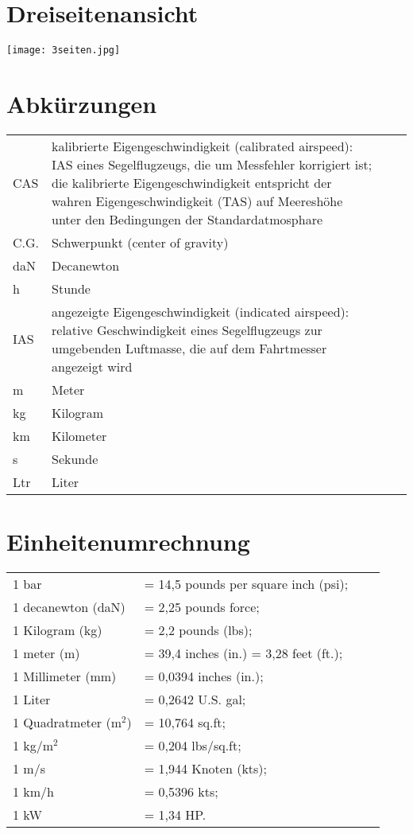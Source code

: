 \section{Dreiseitenansicht}
\vspace{4cm}
\texttt{[image: 3seiten.jpg]}

\section{Abkürzungen}
\begin{tabular}{p{}p{}ll} 
CAS & kalibrierte Eigengeschwindigkeit (calibrated airspeed): IAS eines Segelflugzeugs, die um Messfehler korrigiert ist; die kalibrierte Eigengeschwindigkeit entspricht der wahren Eigengeschwindigkeit (TAS) auf Meereshöhe unter den Bedingungen der Standardatmosphare \\
C.G. & Schwerpunkt (center of gravity)\\
daN & Decanewton \\
h & Stunde \\
IAS & angezeigte Eigengeschwindigkeit (indicated airspeed): relative Geschwindigkeit eines Segelflugzeugs zur umgebenden Luftmasse, die auf dem Fahrtmesser angezeigt wird \\
m & Meter \\
kg & Kilogram  \\
km & Kilometer \\
s & Sekunde \\
Ltr & Liter \\
\end{tabular}

\section{Einheitenumrechnung}
\begin{tabular}{p{}p{}ll}
1 bar & = 14,5 pounds per square inch (psi);\\
1 decanewton (daN)& = 2,25 pounds force;\\
1 Kilogram (kg) & = 2,2 pounds (lbs);\\
1 meter (m) & = 39,4 inches (in.) = 3,28 feet (ft.);\\
1 Millimeter (mm) & = 0,0394 inches (in.);\\
1 Liter & = 0,2642 U.S. gal; \\ 
1 Quadratmeter (m$^2$) &= 10,764 sq.ft;\\
1 kg/m$^2$ &= 0,204 lbs/sq.ft;\\
1 m/s & = 1,944 Knoten (kts);\\
1 km/h & = 0,5396 kts;\\
1 kW & = 1,34 HP.
\end{tabular}
